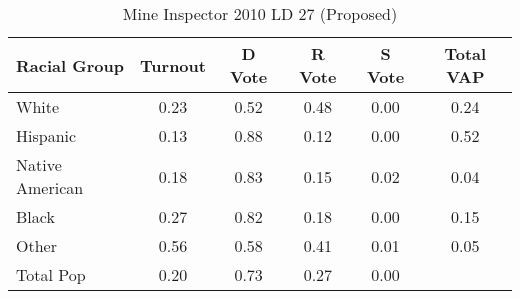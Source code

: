 \begin{table}[htb]
\begin{center}
\caption{Mine Inspector 2010 LD 27 (Proposed)}
\label{smine_vap_ld_27}
\begin{tabular}{lccccc}
  \hline
Racial Group & Turnout & D Vote & R Vote & S Vote & Total VAP \\ 
  \hline
White & 0.23 & 0.52 & 0.48 & 0.00 & 0.24 \\ 
  Hispanic & 0.13 & 0.88 & 0.12 & 0.00 & 0.52 \\ 
  Native American & 0.18 & 0.83 & 0.15 & 0.02 & 0.04 \\ 
  Black & 0.27 & 0.82 & 0.18 & 0.00 & 0.15 \\ 
  Other & 0.56 & 0.58 & 0.41 & 0.01 & 0.05 \\ 
  Total Pop & 0.20 & 0.73 & 0.27 & 0.00 &  \\ 
   \hline
\end{tabular}
\end{center}
\end{table}
